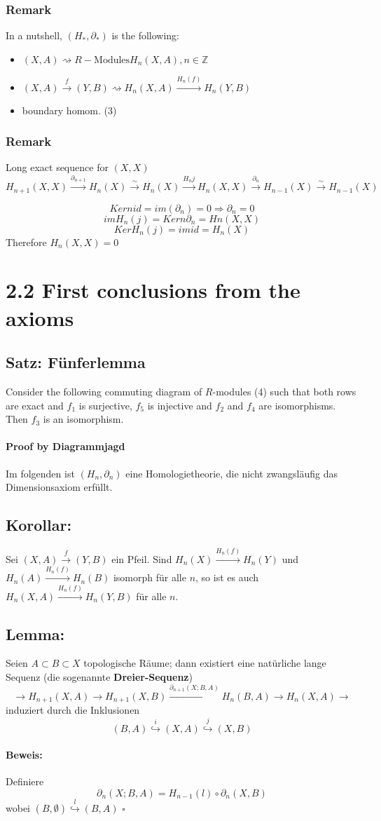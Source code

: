 \documentclass{book}
\newcommand{\Lem}[1]{\subsection{Lemma: #1}}
\newcommand{\Kor}[1]{\subsection{Korollar: #1}}
\newcommand{\Satz}[1]{\subsection{Satz: #1}}
\newenvironment{Beweis}[1]{\paragraph{Beweis: \glqq #1\grqq\\}}{\hfill $\square$}
\renewcommand{\d}{\partial}
\newcommand{\df}[1]{\textbf{#1}\index{#1}}
\newcommand{\Z}{\mathbb{Z}}
\newcommand{\Pfeil}[1]{\overset{#1}{\longrightarrow}}
\newcommand{\pfeil}[1]{\overset{#1}{\rightarrow}}
\newcommand{\Inj}[1]{\overset{#1}{\hookrightarrow}}
\begin{document}
\subsubsection{Remark}
In a nutshell, $(H_*, \partial_*)$ is the following:
\begin{itemize}
	\item $(X,A) \rightsquigarrow R-\text{Modules} H_n(X,A), n \in \Z$
	\item $(X,A) \overset{f}{\rightarrow} (Y,B) \rightsquigarrow H_n(X,A) \overset{H_n(f)}{\rightarrow} H_n(Y,B)$
	\item boundary homom. (3)
\end{itemize}

\subsubsection{Remark}
Long exact sequence for $(X,X)$
\[H_{n+1}(X,X) \overset{\partial_{n+1}}{\longrightarrow} H_n(X) \overset{\sim}{\longrightarrow} H_n(X) \overset{H_nj}{\longrightarrow} H_n(X,X)\overset{\partial_{n}}{\longrightarrow} H_{n-1}(X) \overset{\sim}{\longrightarrow} H_{n-1}(X)  \]

\[Kern id = im(\partial_n) = 0 \Longrightarrow \partial_n = 0 \]
\[im H_n(j) = Kern \partial_n = Hn(X,X)\]
\[Ker H_n(j) = im id = H_n(X) \]
Therefore $H_n(X,X) = 0$

\section{2.2 First conclusions from the axioms}
\Satz{Fünferlemma}
Consider the following commuting diagram of $R$-modules
(4)
such that both rows are exact and $f_1$ is surjective, $f_5$ is injective and $f_2$ and $f_4$ are isomorphisms. Then $f_3$ is an isomorphism.

\paragraph{Proof by Diagrammjagd}


Im folgenden ist $(H_n,\partial_n)$ eine Homologietheorie, die nicht zwangsläufig das Dimensionsaxiom erfüllt.

\Kor{}
Sei $(X,A) \pfeil{f} (Y,B)$ ein Pfeil. Sind $H_n(X) \pfeil{H_n(f)} H_n(Y)$ und $H_n(A) \pfeil{H_n(f)} H_n(B)$ isomorph für alle $n$, so ist es auch $H_n(X,A) \pfeil{H_n(f)} H_n(Y,B)$ für alle $n$.

\Lem{}
Seien $A \subset B \subset X$ topologische Räume; dann existiert eine natürliche lange Sequenz (die sogenannte \df{Dreier-Sequenz})
\[\Pfeil{} H_{n+1}(X,A) \Pfeil{} H_{n+1}(X,B) \Pfeil{\d_{n+1}(X;B,A)} H_n(B, A) \Pfeil{} H_n(X,A) \Pfeil{} \]
induziert durch die Inklusionen
\[ (B, A) \Inj{i} (X,A) \Inj{j} (X,B) \]
\begin{Beweis}{}
Definiere
\[\d_n(X;B,A) = H_{n-1}(l) \circ \d_n(X, B) \]
wobei $(B,\emptyset) \Inj{l} (B,A) $
\end{Beweis}
\end{document}
